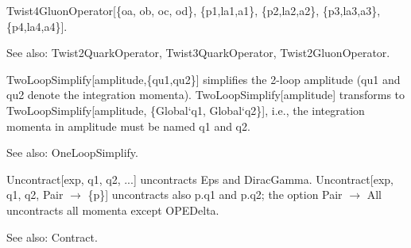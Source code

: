 

Twist4GluonOperator[\{oa, ob, oc, od\}, \{p1,la1,a1\}, \{p2,la2,a2\}, \{p3,la3,a3\}, \{p4,la4,a4\}].

See also:  Twist2QuarkOperator, Twist3QuarkOperator, Twist2GluonOperator.






TwoLoopSimplify[amplitude,\{qu1,qu2\}] simplifies the 2-loop amplitude (qu1 and qu2 denote the integration momenta).
  TwoLoopSimplify[amplitude] transforms to TwoLoopSimplify[amplitude, \{Global`q1, Global`q2\}], i.e., the integration momenta in
  amplitude must be named q1 and q2.

See also:  OneLoopSimplify.





Uncontract[exp, q1, q2, ...] uncontracts Eps and DiracGamma. Uncontract[exp, q1, q2, Pair \(\rightarrow \) \{p\}] uncontracts also p.q1
  and p.q2; the option Pair \(\rightarrow \) All uncontracts all momenta except OPEDelta.



See also:  Contract.

